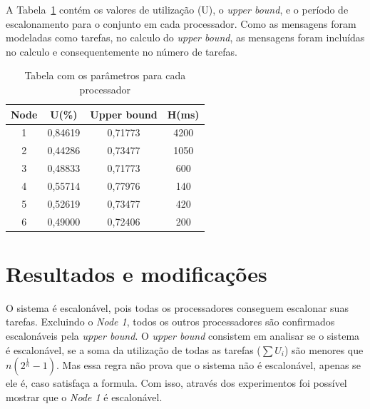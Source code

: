 \documentclass[12pt]{article}
\begin{document}
A Tabela~\ref{tab} contém os valores de utilização (U), o \textit{upper bound}, e o período de escalonamento para o conjunto em cada processador. Como as mensagens foram modeladas como tarefas, no calculo do \textit{upper bound}, as mensagens foram incluídas no calculo e consequentemente no número de tarefas.

\begin{table}[ht]
\centering
\caption{Tabela com os parâmetros para cada processador}
\label{tab}
\begin{tabular}{|c|c|c|c|}
\hline
\textbf{Node} & \textbf{U(\%)} & \textbf{Upper bound} & \textbf{H(ms)} \\ \hline
1             & 0,84619    &      0,71773         & 4200           \\ \hline
2             & 0,44286    &      0,73477         & 1050           \\ \hline
3             & 0,48833    &      0,71773         & 600            \\ \hline
4             & 0,55714    &      0,77976         & 140            \\ \hline
5             & 0,52619    &      0,73477         & 420            \\ \hline
6             & 0,49000    &      0,72406         & 200            \\ \hline
\end{tabular}
\end{table}

\section{Resultados e modificações}

O sistema é escalonável, pois todas os processadores conseguem escalonar suas tarefas. Excluindo o \textit{Node 1}, todos os outros processadores são confirmados escalonáveis pela \textit{upper bound}. O \textit{upper bound} consistem em analisar se o sistema é escalonável, se a soma da utilização de todas as tarefas ($\sum{U_{i}}$) são menores que $n (2^{\frac{1}{n}} - 1)$. Mas essa regra não prova que o sistema não é escalonável, apenas se ele é, caso satisfaça a formula. Com isso, através dos experimentos foi possível mostrar que o \textit{Node 1} é escalonável.
\end{document}
